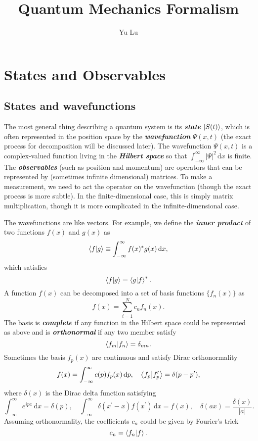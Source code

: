 \documentclass{article}
\title{Quantum Mechanics Formalism}
\author{Yu Lu}
\theoremstyle{nonumberplain}
\begin{document}
\maketitle
\section{States and Observables}
\subsection{States and wavefunctions}
The most general thing describing a quantum system is its \textit{\textbf{state}} $\ket{S(t)}$, which is often represented in the position space by the \textit{\textbf{wavefunction}} $\Psi(x,t)$ (the exact process for decomposition will be discussed later). The wavefunction $\Psi (x,t)$ is a complex-valued function living in the \textit{\textbf{Hilbert space}} so that 
\( \int_{-\infty}^{\infty} \left\vert \Psi  \right\vert ^2 \,\mathrm{d}x  \)  
is finite. 
The \textit{\textbf{observables}} (such as position and momentum) are operators that can be represented by (sometimes infinite dimensional) matrices. To make a measurement, we need to act the operator on the wavefunction (though the exact process is more subtle). In the finite-dimensional case, this is simply matrix multiplication, though it is more complicated in the infinite-dimensional case. 

The wavefunctions are like vectors. For example, we define the \textit{\textbf{inner product}} of two functions $f(x)$ and $g(x)$ as 
\[
    \braket{f}{g} \equiv \int_{-\infty}^{\infty} f(x)^* g(x) \,\mathrm{d}x, 
\]
which satisfies
\[
    \braket{f}{g} = \braket{g}{f}^*.
\]
A function $f(x)$ can be decomposed into a set of basis functions $\{f_n(x)\}$ as 
\[
    f(x) = \sum_{i=1}^{N} c_n f_n(x).
\]
The basis is \textit{\textbf{complete}} if any function in the Hilbert space could be represented as above and is \textit{\textbf{orthonormal}} if any two member satisfy 
\[
    \braket{f_m}{f_n} = \delta _{mn}.
\]
Sometimes the basis $f_p(x)$ are continuous and satisfy Dirac orthonormality
\[
    f(x) = \int_{-\infty}^{\infty} c(p) f_p(x) \,\mathrm{d}p,
    \quad 
    \braket{f_p}{f_p^\prime } = \delta (p-p^\prime ),
\]
where $\delta (x)$ is the Dirac delta function satisfying
\[
    \int_{-\infty}^{\infty} e^{i p x} \,\mathrm{d}x = \delta (p),
    \quad
    \int_{-\infty}^{\infty} \delta (x^\prime -x) f(x^\prime ) \,\mathrm{d}{x}  = f(x), 
    \quad 
    \delta (a x) = \frac{\delta (x)}{\left\vert a \right\vert }.
\]
Assuming orthonormality, the coefficients $c_n$ could be given by Fourier's trick 
\[
    c_n = \braket{f_n}{f}.
\]
\end{document}
